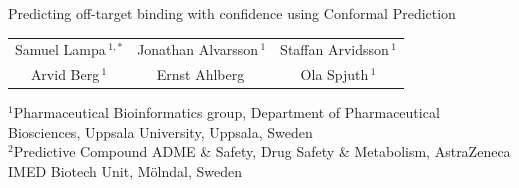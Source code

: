 \documentclass[10pt,article]{memoir}
\begin{document}
\begin{center}
{\LARGE\noindent Predicting off-target binding with confidence using Conformal
Prediction}
\end{center}

\begin{center}
\noindent
\begin{tabular}{ccc}
Samuel Lampa\,$^{1,*}$  & Jonathan Alvarsson\,$^{1}$ &  Staffan Arvidsson\,$^{1}$ \\
 Arvid Berg\,$^{1}$ &Ernst Ahlberg\, & Ola Spjuth\,$^{1}$ \\
\end{tabular}
\end{center}

\noindent
\begin{minipage}{1.1\textwidth}
\noindent\footnotesize $^1$Pharmaceutical Bioinformatics group, Department of Pharmaceutical Biosciences, Uppsala University, Uppsala, Sweden \\ 
\noindent\footnotesize $^2$Predictive Compound ADME \& Safety, Drug Safety \& Metabolism, AstraZeneca IMED Biotech Unit, Mölndal, Sweden \\ 
\end{minipage}


\def\keyFont{\fontsize{8}{11}\helveticabold }
\def\firstAuthorLast{Lampa {et~al.}} %
\def\Authors{Samuel Lampa\,$^{1,*}$, Jonathan Alvarsson\,$^{1}$, Staffan Arvidsson\,$^{1}$, Arvid Berg\,$^{1}$, Ernst Ahlberg\,$^{2}$  and Ola Spjuth\,$^{1}$}
\def\Address{$^{1}$Pharmaceutical Bioinformatics group, Department of Pharmaceutical Biosciences, Uppsala University, Uppsala, Sweden\\
$^{2}$Predictive Compound ADME \& Safety, Drug Safety \& Metabolism, AstraZeneca IMED Biotech Unit, M"olndal, Sweden}
\def\corrAuthor{Corresponding Author}

\def\corrEmail{samuel.lampa@farmbio.uu.se}
\end{document}
